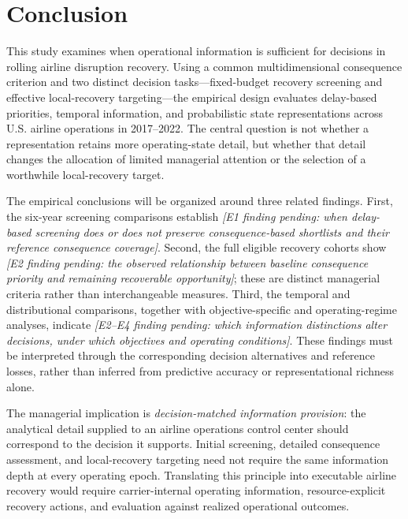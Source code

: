 \section{Conclusion}
\label{sec:conclusion}

This study examines when operational information is sufficient for decisions in rolling airline disruption recovery. Using a common multidimensional consequence criterion and two distinct decision tasks---fixed-budget recovery screening and effective local-recovery targeting---the empirical design evaluates delay-based priorities, temporal information, and probabilistic state representations across U.S. airline operations in 2017--2022. The central question is not whether a representation retains more operating-state detail, but whether that detail changes the allocation of limited managerial attention or the selection of a worthwhile local-recovery target.

The empirical conclusions will be organized around three related findings. First, the six-year screening comparisons establish \emph{[E1 finding pending: when delay-based screening does or does not preserve consequence-based shortlists and their reference consequence coverage]}. Second, the full eligible recovery cohorts show \emph{[E2 finding pending: the observed relationship between baseline consequence priority and remaining recoverable opportunity]}; these are distinct managerial criteria rather than interchangeable measures. Third, the temporal and distributional comparisons, together with objective-specific and operating-regime analyses, indicate \emph{[E2--E4 finding pending: which information distinctions alter decisions, under which objectives and operating conditions]}. These findings must be interpreted through the corresponding decision alternatives and reference losses, rather than inferred from predictive accuracy or representational richness alone.

The managerial implication is \emph{decision-matched information provision}: the analytical detail supplied to an airline operations control center should correspond to the decision it supports. Initial screening, detailed consequence assessment, and local-recovery targeting need not require the same information depth at every operating epoch. Translating this principle into executable airline recovery would require carrier-internal operating information, resource-explicit recovery actions, and evaluation against realized operational outcomes.

